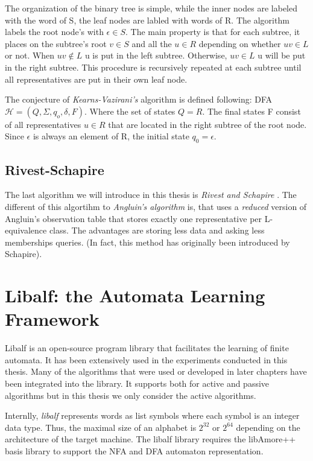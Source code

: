 The organization of the binary tree is simple, while the inner nodes are labeled with 
the word of S, the leaf nodes are labled with words of R. The algorithm labels the root node's 
with $\epsilon \in S$.
The main property is that for each subtree, it places on the subtree's root $v \in S$
and all the $u \in R$ depending on whether $uv \in L$ or not. When $uv \notin L$ u is put in the left subtree.
Otherwise, $uv \in L$ u will be put in the right subtree. 
This procedure is recursively repeated at each subtree until all representatives
are put in their own leaf node.

The conjecture of \textit{Kearns-Vazirani's} algorithm is defined following: DFA $\mathcal{H} = (Q, \Sigma, q_o, \delta, F)$.
Where the set of states $Q = R$. The final states F consist of all representatives $u \in R$
that are located in the right subtree of the root node. 
Since $\epsilon$ is always an element of R, the initial state $q_0 = \epsilon$.
\subsection{Rivest-Schapire}
The last algorithm we will introduce in this thesis is \textit{Rivest and Schapire} \cite*{rivest1989inference}.
The different of this algortihm to \textit{Angluin's algorithm} is,
that uses a \textit{reduced} version of Angluin's observation table
that stores exactly one representative per L-equivalence class.
The advantages are storing less data and asking less memberships queries.
(In fact, this method has originally been introduced by Schapire). 
\section{Libalf: the Automata Learning Framework}\label{section:libalf}
Libalf \cite*{bollig2010libalf} is an open-source program library that facilitates the learning of finite automata. 
It has been extensively used in the experiments conducted in this thesis. 
Many of the algorithms that were used or developed in later chapters have been integrated into the library.
It supports both for active and passive algorithms but 
in this thesis we only consider the active algorithms.

Internlly, \textit{libalf} represents words as list symbols
where each symbol is an integer data type. Thus, the maximal size
of an alphabet is $2^{32}$ or $2^{64}$ depending on the architecture of the 
target machine.
The libalf library requires the libAmore++ basis library to support the NFA and DFA automaton representation.